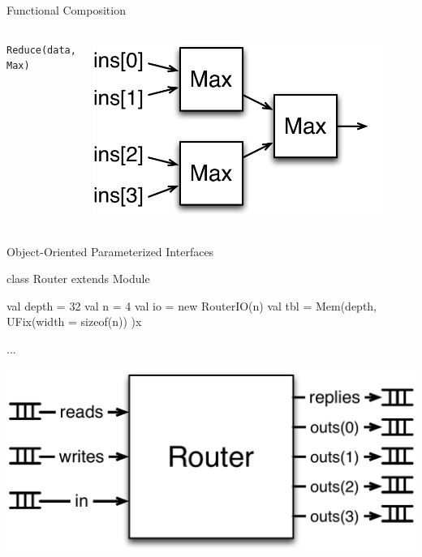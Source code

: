 \documentclass[xcolor=pdflatex,dvipsnames,table]{beamer}
\begin{document}
\begin{frame}[fragile]{Functional Composition}
\begin{columns}
\verb+Reduce(data, Max)+ \\
\begin{center}
\includegraphics[width=0.9\textwidth]{../bootcamp/figs/reduce.pdf} \\
\end{center}

\end{columns}
\end{frame}

\begin{frame}[fragile]{Object-Oriented Parameterized Interfaces}
\begin{scala}
class Router extends Module {
  val depth = 32
  val n     = 4
  val io    = new RouterIO(n)
  val tbl   = Mem(depth, UFix(width = sizeof(n)) )x
  
  ...
}
\end{scala}
\begin{center}
\includegraphics[height=0.45\textheight]{../bootcamp/figs/trouter.pdf} 
\end{center}
\end{frame}
\end{document}
